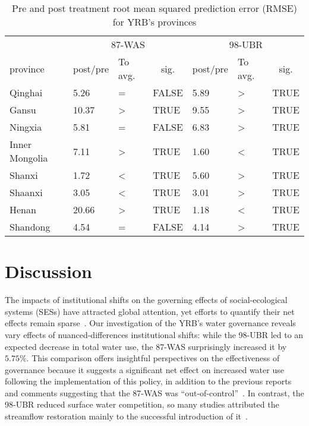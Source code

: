 \documentclass[preprint, 12pt]{elsarticle}
\begin{document}
\begin{table}[!htbp]\footnotesize
	\centering
	\caption{Pre and post treatment root mean squared prediction error (RMSE) for YRB's provinces}\label{tab:DSC_summary}
	\begin{tabularx}{0.8\textwidth}{XXXXXXX}
	  \toprule
			& \multicolumn{3}{c}{87-WAS} & \multicolumn{3}{c}{98-UBR} \\
  \cmidrule{2-7}    province  & \multicolumn{1}{c}{post/pre} & To avg. & \multicolumn{1}{c}{sig.} & \multicolumn{1}{c}{post/pre} & To avg.   & \multicolumn{1}{c}{sig.} \\
	  \midrule
	  Qinghai & 5.26  & =     & FALSE & 5.89  & >     & TRUE \\
	  Gansu & 10.37  & >     & TRUE  & 9.55  & >     & TRUE \\
	  Ningxia & 5.81  & =     & FALSE & 6.83  & >     & TRUE \\
	  Inner Mongolia & 7.11  & >     & TRUE  & 1.60  & <     & TRUE \\
	  Shanxi & 1.72  & <     & TRUE  & 5.60  & >     & TRUE \\
	  Shaanxi & 3.05  & <     & TRUE  & 3.01  & >     & TRUE \\
	  Henan & 20.66  & >     & TRUE  & 1.18  & <     & TRUE \\
	  Shandong & 4.54  & =     & FALSE & 4.14  & >     & TRUE \\
	  \bottomrule
	  \end{tabularx}\label{tab:addlabel}\end{table}
\section{Discussion}\label{sec:discussion}


The impacts of institutional shifts on the governing effects of social-ecological systems (SESs) have attracted global attention, yet efforts to quantify their net effects remain sparse~\cite{cumming2020a}.
Our investigation of the YRB's water governance reveals vary effects of nuanced-differences institutional shifts: while the 98-UBR led to an expected decrease in total water use, the 87-WAS surprisingly increased it by $5.75\%$.
This comparison offers insightful perspectives on the effectiveness of governance because it suggests a significant net effect on increased water use following the implementation of this policy, in addition to the previous reports and comments suggesting that the 87-WAS was ``out-of-control''~\cite{wang2019d, departmentofearthsciences1999}.
In contrast, the 98-UBR reduced surface water competition, so many studies attributed the streamflow restoration mainly to the successful introduction of it~\cite{chen2021,huangang2002,an2007}.
\end{document}
